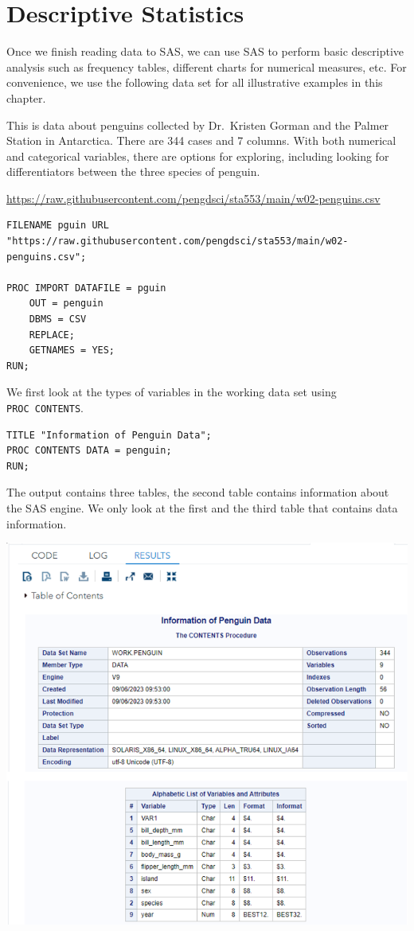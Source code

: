 \documentclass[
]{book}
\begin{document}
\hypertarget{descriptive-statistics}{%
\chapter{Descriptive Statistics}\label{descriptive-statistics}}

Once we finish reading data to SAS, we can use SAS to perform basic descriptive analysis such as frequency tables, different charts for numerical measures, etc. For convenience, we use the following data set for all illustrative examples in this chapter.

This is data about penguins collected by Dr.~Kristen Gorman and the Palmer Station in Antarctica. There are 344 cases and 7 columns. With both numerical and categorical variables, there are options for exploring, including looking for differentiators between the three species of penguin.

\url{https://raw.githubusercontent.com/pengdsci/sta553/main/w02-penguins.csv}

\begin{verbatim}
FILENAME pguin URL "https://raw.githubusercontent.com/pengdsci/sta553/main/w02-penguins.csv";

PROC IMPORT DATAFILE = pguin
    OUT = penguin        
    DBMS = CSV  
    REPLACE;
    GETNAMES = YES;
RUN;
\end{verbatim}

We first look at the types of variables in the working data set using \texttt{PROC\ CONTENTS}.

\begin{verbatim}
TITLE "Information of Penguin Data";
PROC CONTENTS DATA = penguin;
RUN;
\end{verbatim}

The output contains three tables, the second table contains information about the SAS engine. We only look at the first and the third table that contains data information.

\begin{center}\includegraphics[width=1\linewidth]{img05/w05-DataContents} \end{center}
\end{document}
